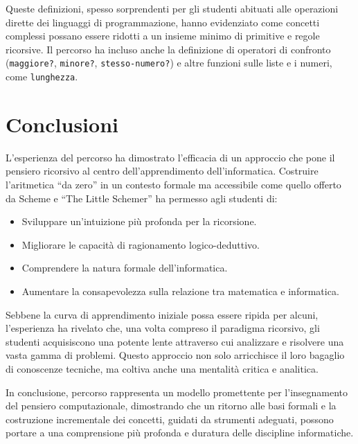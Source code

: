 \documentclass[withtimes]{easychair}
\begin{document}
Queste definizioni, spesso sorprendenti per gli studenti abituati alle operazioni dirette dei linguaggi di programmazione, hanno evidenziato
come concetti complessi possano essere ridotti a un insieme minimo di primitive e regole ricorsive. Il percorso ha incluso anche la definizione di operatori di confronto (\texttt{maggiore?}, \texttt{minore?}, \texttt{stesso-numero?}) e altre funzioni sulle liste e i numeri, come \texttt{lunghezza}.

\section{Conclusioni}\label{conclusioni}

L'esperienza del percorso ha dimostrato l'efficacia di un approccio che pone il pensiero ricorsivo al centro dell'apprendimento dell'informatica. Costruire l'aritmetica ``da zero'' in un contesto formale ma accessibile come quello offerto da Scheme e ``The Little Schemer'' ha permesso agli studenti di:

\begin{itemize}
\item   Sviluppare un'intuizione più profonda per la ricorsione. %
\item   Migliorare le capacità di ragionamento logico-deduttivo. %
\item   Comprendere la natura formale dell'informatica. %
\item  Aumentare la consapevolezza sulla relazione tra matematica e informatica. %
\end{itemize}

Sebbene la curva di apprendimento iniziale possa essere ripida per alcuni, l'esperienza ha rivelato che, una volta compreso il paradigma ricorsivo, gli studenti acquisiscono una potente lente attraverso cui analizzare e risolvere una vasta gamma di problemi. Questo approccio non solo arricchisce il loro bagaglio di conoscenze tecniche, ma coltiva
anche una mentalità critica e analitica.%

In conclusione, percorso rappresenta un modello promettente per l'insegnamento del pensiero computazionale, dimostrando che un ritorno alle basi formali e la costruzione incrementale dei concetti, guidati da strumenti adeguati, possono portare a una comprensione più profonda e duratura delle discipline informatiche.

\label{sect:bib}
\printbibliography
\end{document}
